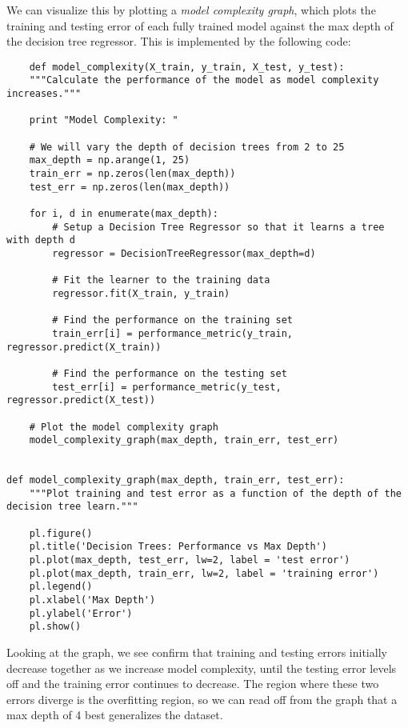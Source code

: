 \documentclass[12 pt]{article}
\numberwithin{equation}{section}
\begin{document}
We can visualize this by plotting a \emph{model complexity graph}, which plots the training and testing error of each fully trained model against the max depth of the decision tree regressor. This is implemented by the following code:

\begin{verbatim}
	def model_complexity(X_train, y_train, X_test, y_test):
    """Calculate the performance of the model as model complexity increases."""

    print "Model Complexity: "

    # We will vary the depth of decision trees from 2 to 25
    max_depth = np.arange(1, 25)
    train_err = np.zeros(len(max_depth))
    test_err = np.zeros(len(max_depth))

    for i, d in enumerate(max_depth):
        # Setup a Decision Tree Regressor so that it learns a tree with depth d
        regressor = DecisionTreeRegressor(max_depth=d)

        # Fit the learner to the training data
        regressor.fit(X_train, y_train)

        # Find the performance on the training set
        train_err[i] = performance_metric(y_train, regressor.predict(X_train))

        # Find the performance on the testing set
        test_err[i] = performance_metric(y_test, regressor.predict(X_test))

    # Plot the model complexity graph
    model_complexity_graph(max_depth, train_err, test_err)


def model_complexity_graph(max_depth, train_err, test_err):
    """Plot training and test error as a function of the depth of the decision tree learn."""

    pl.figure()
    pl.title('Decision Trees: Performance vs Max Depth')
    pl.plot(max_depth, test_err, lw=2, label = 'test error')
    pl.plot(max_depth, train_err, lw=2, label = 'training error')
    pl.legend()
    pl.xlabel('Max Depth')
    pl.ylabel('Error')
    pl.show()
\end{verbatim}

Looking at the graph, we see confirm that training and testing errors initially decrease together as we increase model complexity, until the testing error levels off and the training error continues to decrease. The region where these two errors diverge is the overfitting region, so we can read off from the graph that a max depth of 4 best generalizes the dataset.
\end{document}
